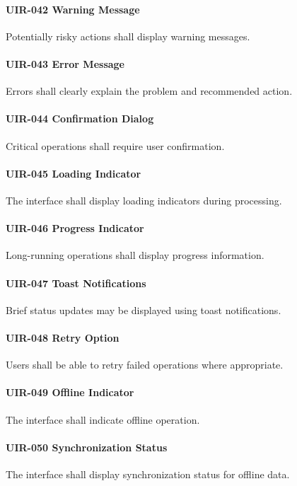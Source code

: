 \paragraph{UIR-042 Warning Message}
Potentially risky actions shall display warning messages.

\paragraph{UIR-043 Error Message}
Errors shall clearly explain the problem and recommended action.

\paragraph{UIR-044 Confirmation Dialog}
Critical operations shall require user confirmation.

\paragraph{UIR-045 Loading Indicator}
The interface shall display loading indicators during processing.

\paragraph{UIR-046 Progress Indicator}
Long-running operations shall display progress information.

\paragraph{UIR-047 Toast Notifications}
Brief status updates may be displayed using toast notifications.

\paragraph{UIR-048 Retry Option}
Users shall be able to retry failed operations where appropriate.

\paragraph{UIR-049 Offline Indicator}
The interface shall indicate offline operation.

\paragraph{UIR-050 Synchronization Status}
The interface shall display synchronization status for offline data.

